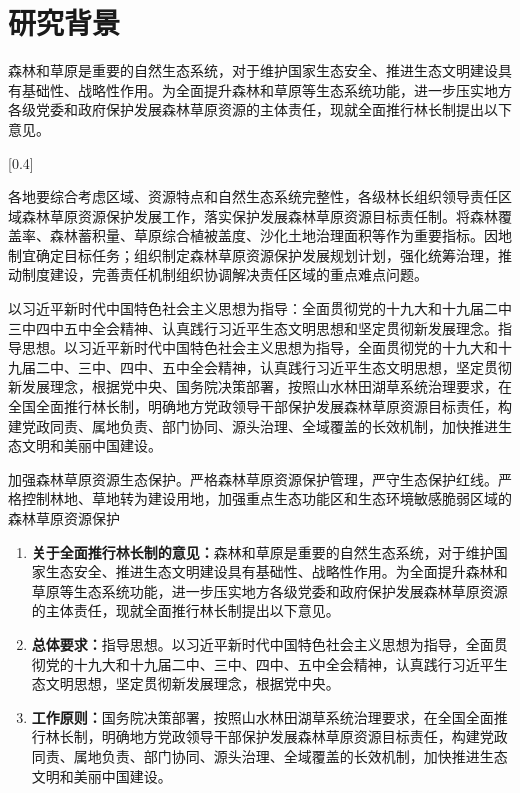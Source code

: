 \section{研究背景}

森林和草原是重要的自然生态系统，对于维护国家生态安全、推进生态文明建设具有基础性、战略性作用。为全面提升森林和草原等生态系统功能，进一步压实地方各级党委和政府保护发展森林草原资源的主体责任，现就全面推行林长制提出以下意见。

[0.4]

各地要综合考虑区域、资源特点和自然生态系统完整性\cite{Chu2014Discovering}\cite{2005What}，各级林长组织领导责任区域森林草原资源保护发展工作\cite{1996How}\cite{2005What}，落实保护发展森林草原资源目标责任制\cite{ziemann2016gene}。将森林覆盖率、森林蓄积量、草原综合植被盖度、沙化土地治理面积等作为重要指标\cite{Tibbetts}。因地制宜确定目标任务；组织制定森林草原资源保护发展规划计划，强化统筹治理，推动制度建设，完善责任机制组织协调解决责任区域的重点难点问题。

以习近平新时代中国特色社会主义思想为指导：全面贯彻党的十九大和十九届二中\cite{Bohannon2005A}三中\cite{Chu2013Holistic}四中\cite{hao2017cleaning}五中全会精神\cite{Hao2018Distilling}、认真践行习近平生态文明思想\cite{Rekatsinas2017HoloClean}和坚定贯彻新发展理念\cite{Yakout2011Guided}。指导思想。以习近平新时代中国特色社会主义思想为指导，全面贯彻党的十九大和十九届二中、三中、四中、五中全会精神，认真践行习近平生态文明思想，坚定贯彻新发展理念，根据党中央、国务院决策部署，按照山水林田湖草系统治理要求，在全国全面推行林长制，明确地方党政领导干部保护发展森林草原资源目标责任，构建党政同责、属地负责、部门协同、源头治理、全域覆盖的长效机制，加快推进生态文明和美丽中国建设。

加强森林草原资源生态保护。严格森林草原资源保护管理，严守生态保护红线。严格控制林地、草地转为建设用地，加强重点生态功能区和生态环境敏感脆弱区域的森林草原资源保护

\begin{enumerate}
    \item \textbf{关于全面推行林长制的意见：}森林和草原是重要的自然生态系统，对于维护国家生态安全、推进生态文明建设具有基础性、战略性作用。为全面提升森林和草原等生态系统功能，进一步压实地方各级党委和政府保护发展森林草原资源的主体责任，现就全面推行林长制提出以下意见。
    \item \textbf{总体要求：}指导思想。以习近平新时代中国特色社会主义思想为指导，全面贯彻党的十九大和十九届二中、三中、四中、五中全会精神，认真践行习近平生态文明思想，坚定贯彻新发展理念，根据党中央。
    \item \textbf{工作原则：}国务院决策部署，按照山水林田湖草系统治理要求，在全国全面推行林长制，明确地方党政领导干部保护发展森林草原资源目标责任，构建党政同责、属地负责、部门协同、源头治理、全域覆盖的长效机制，加快推进生态文明和美丽中国建设。
\end{enumerate}


